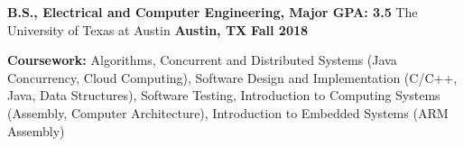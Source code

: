 \begin{cventries}
  \cventry
    {\textbf{\normalsize B.S., Electrical and Computer Engineering, Major GPA: \large 3.5}}
    {\large The University of Texas at Austin}
    {\normalsize \textbf{Austin, TX}}
    {\normalsize \textbf{Fall 2018}}
    {
      \begin{cvitems}
        \item {\normalsize \textbf{Coursework:} Algorithms, Concurrent and Distributed Systems (Java Concurrency, Cloud Computing), Software Design and Implementation (C/C++, Java, Data Structures), Software Testing, Introduction to Computing Systems (Assembly, Computer Architecture), Introduction to Embedded Systems (ARM Assembly)}
      \end{cvitems}
    }
\end{cventries}

